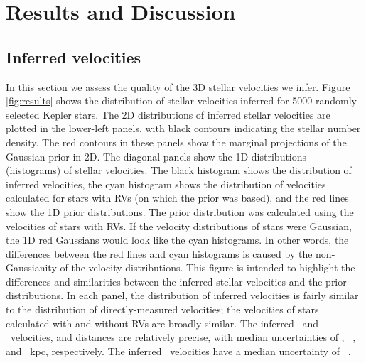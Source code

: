 \section{Results and Discussion}
\label{sec:results}

\subsection{Inferred velocities}

In this section we assess the quality of the 3D stellar velocities we infer.
Figure \ref{fig:results} shows the distribution of stellar velocities inferred
for 5000 randomly selected Kepler stars.
The 2D distributions of inferred stellar velocities are plotted in the
lower-left panels, with black contours indicating the stellar number density.
The red contours in these panels show the marginal projections of the
Gaussian prior in 2D.
The diagonal panels show the 1D distributions (histograms) of stellar
velocities.
The black histogram shows the distribution of inferred velocities, the cyan
histogram shows the distribution of velocities calculated for stars with RVs
(on which the prior was based), and the red lines show the 1D prior
distributions.
The prior distribution was calculated using the velocities of stars with RVs.
If the velocity distributions of stars were Gaussian, the 1D red Gaussians
would look like the cyan histograms.
In other words, the differences between the red lines and cyan histograms
is caused by the non-Gaussianity of the velocity distributions.
This figure is intended to highlight the differences and similarities
between the inferred stellar velocities and the prior distributions.
In each panel, the distribution of inferred velocities is fairly similar to
the distribution of directly-measured velocities; the velocities of stars
calculated with and without RVs are broadly similar.
The inferred \vx\ and \vz\ velocities, and distances are relatively
precise, with median uncertainties of \vxprecision \kms, \vzprecision\ \kms,
and \dprecision\ kpc, respectively.
The inferred \vy\ velocities have a median uncertainty of \vyprecision\ \kms.

